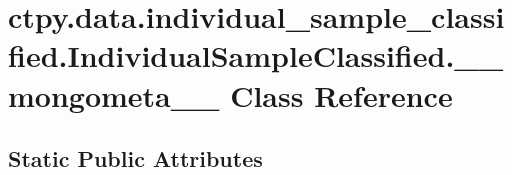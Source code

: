 \hypertarget{classctpy_1_1data_1_1individual__sample__classified_1_1_individual_sample_classified_1_1____mongometa____}{\section{ctpy.\-data.\-individual\-\_\-sample\-\_\-classified.\-Individual\-Sample\-Classified.\-\_\-\-\_\-mongometa\-\_\-\-\_\- Class Reference}
\label{classctpy_1_1data_1_1individual__sample__classified_1_1_individual_sample_classified_1_1____mongometa____}
}
\subsection*{Static Public Attributes}
